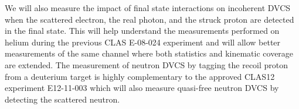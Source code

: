 We will also measure the impact of final state interactions on incoherent DVCS 
when the scattered electron, the real photon, and the struck proton are 
detected in the final state. This will help understand the measurements 
performed on helium during the previous CLAS E-08-024 experiment and will allow 
better measurements of the same channel where both statistics and kinematic
coverage are extended. The measurement of neutron DVCS by tagging the recoil 
proton from a deuterium target is highly complementary to the approved 
CLAS12 experiment E12-11-003 which will also measure quasi-free neutron DVCS by 
detecting the scattered neutron.

